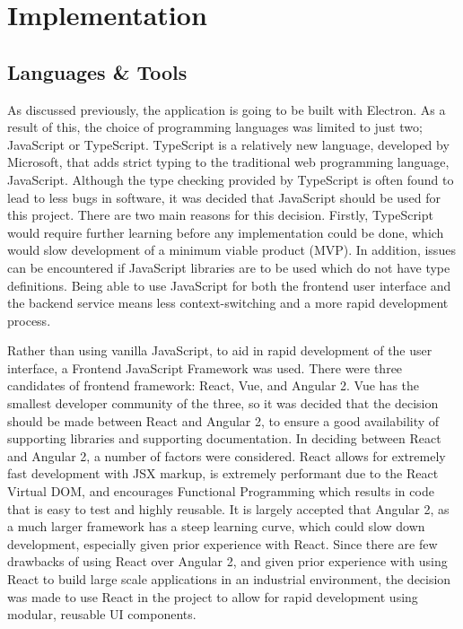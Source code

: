 \chapter{Implementation}


\section{Languages \& Tools}\label{sec:languages-tools}
As discussed previously, the application is going to be built with Electron. As a result of this, the choice of programming languages was limited to just two; JavaScript or TypeScript. TypeScript is a relatively new language, developed by Microsoft, that adds strict typing to the traditional web programming language, JavaScript. Although the type checking provided by TypeScript is often found to lead to less bugs in software, it was decided that JavaScript should be used for this project. There are two main reasons for this decision. Firstly, TypeScript would require further learning before any implementation could be done, which would slow development of a minimum viable product (MVP). In addition, issues can be encountered if JavaScript libraries are to be used which do not have type definitions. Being able to use JavaScript for both the frontend user interface and the backend service means less context-switching and a more rapid development process.

Rather than using vanilla JavaScript, to aid in rapid development of the user interface, a Frontend JavaScript Framework was used.  There were three candidates of frontend framework: React, Vue, and Angular 2. Vue has the smallest developer community of the three, so it was decided that the decision should be made between React and Angular 2, to ensure a good availability of supporting libraries and supporting documentation. In deciding between React and Angular 2, a number of factors were considered. React allows for extremely fast development with JSX markup, is extremely performant due to the React Virtual DOM, and encourages Functional Programming which results in code that is easy to test and highly reusable. It is largely accepted that Angular 2, as a much larger framework has a steep learning curve, which could slow down development, especially given prior experience with React. Since there are few drawbacks of using React over Angular 2, and given prior experience with using React to build large scale applications in an industrial environment, the decision was made to use React in the project to allow for rapid development using modular, reusable UI components.

